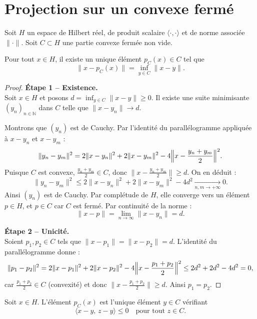 \documentclass[11pt,a4paper]{article}
\begin{document}
\section{Projection sur un convexe fermé}

Soit $H$ un espace de Hilbert réel, de produit scalaire $\langle \cdot,\cdot\rangle$
et de norme associée $\|\cdot\|$. Soit $C \subset H$ une partie convexe fermée non vide.

\begin{theorem}
Pour tout $x \in H$, il existe un unique élément $p_C(x) \in C$ tel que
\[
\|x - p_C(x)\| = \inf_{y \in C} \|x - y\|.
\]
\end{theorem}

\begin{proof}
\noindent
\textbf{Étape 1 -- Existence.}\\
Soit $x \in H$ et posons $d = \inf_{y \in C} \|x - y\| \geq 0$.
Il existe une suite minimisante $(y_n)_{n\in\mathbb{N}}$ dans $C$ telle que
$\|x - y_n\| \to d$.

Montrons que $(y_n)$ est de Cauchy. Par l'identité du parallélogramme appliquée
à $x - y_n$ et $x - y_m$ :
\[
\|y_n - y_m\|^2
= 2\|x - y_n\|^2 + 2\|x - y_m\|^2 - 4\Bigl\|x - \frac{y_n + y_m}{2}\Bigr\|^2.
\]
Puisque $C$ est convexe, $\frac{y_n + y_m}{2} \in C$, donc
$\bigl\|x - \frac{y_n + y_m}{2}\bigr\| \geq d$. On en déduit :
\[
\|y_n - y_m\|^2 \leq 2\|x - y_n\|^2 + 2\|x - y_m\|^2 - 4d^2 \xrightarrow[n,m \to +\infty]{} 0.
\]
Ainsi $(y_n)$ est de Cauchy. Par complétude de $H$, elle converge vers un
élément $p \in H$, et $p \in C$ car $C$ est fermé. Par continuité de la norme :
\[
\|x - p\| = \lim_{n\to\infty} \|x - y_n\| = d.
\]

\textbf{Étape 2 -- Unicité.}\\
Soient $p_1, p_2 \in C$ tels que $\|x - p_1\| = \|x - p_2\| = d$.
L'identité du parallélogramme donne :
\[
\|p_1 - p_2\|^2
= 2\|x - p_1\|^2 + 2\|x - p_2\|^2 - 4\Bigl\|x - \frac{p_1 + p_2}{2}\Bigr\|^2
\leq 2d^2 + 2d^2 - 4d^2 = 0,
\]
car $\frac{p_1+p_2}{2} \in C$ (convexité) et donc
$\bigl\|x - \frac{p_1+p_2}{2}\bigr\| \geq d$.
Ainsi $p_1 = p_2$.
\end{proof}

\begin{proposition}
Soit $x \in H$. L'élément $p_C(x)$ est l'unique élément $y \in C$ vérifiant
\[
\langle x - y,\, z - y \rangle \leq 0 \quad \text{pour tout } z \in C.
\]
\end{proposition}
\end{document}
